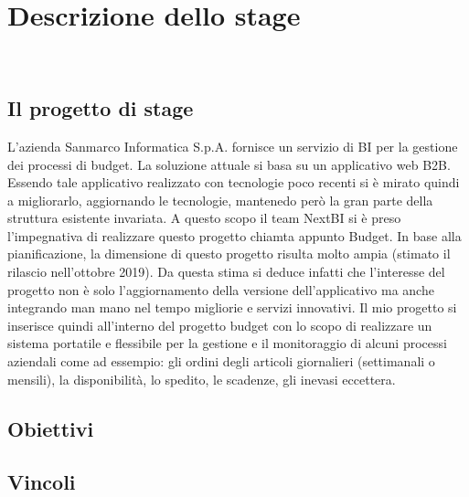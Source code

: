 
\chapter{Descrizione dello stage}
\label{cap:descrizione-stage}

 \\

\section{Il progetto di stage}

L'azienda Sanmarco Informatica S.p.A. fornisce un servizio di BI per la gestione dei processi di budget. La soluzione attuale si basa su un applicativo web B2B. Essendo tale applicativo realizzato con tecnologie poco recenti si è mirato quindi a migliorarlo, aggiornando le tecnologie, mantenedo però la gran parte della struttura esistente invariata.  A questo scopo il team NextBI si è preso l'impegnativa di realizzare questo progetto chiamta appunto Budget. In base alla pianificazione, la dimensione di questo progetto risulta molto ampia (stimato il rilascio nell'ottobre 2019). Da questa stima si deduce infatti che l'interesse del progetto non è solo l'aggiornamento della  versione dell'applicativo ma anche integrando man mano nel tempo migliorie e servizi innovativi. Il mio progetto si inserisce quindi all'interno del progetto budget con lo scopo di realizzare un sistema portatile e flessibile per la gestione e il monitoraggio di alcuni processi aziendali come ad essempio: gli ordini degli articoli giornalieri (settimanali o mensili), la disponibilità, lo spedito, le scadenze, gli inevasi eccettera. 





\section{Obiettivi}

\section{Vincoli}


